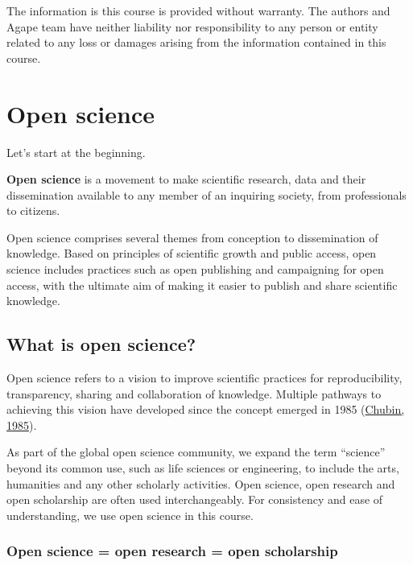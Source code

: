 \documentclass[
]{book}
\begin{document}
The information is this course is provided without warranty. The authors and Agape team have neither liability nor responsibility to any person or entity related to any loss or damages arising from the information contained in this course.

\hypertarget{open-science}{%
\chapter{Open science}\label{open-science}}

Let's start at the beginning.

\textbf{Open science} is a movement to make scientific research, data and their dissemination available to any member of an inquiring society, from professionals to citizens.

Open science comprises several themes from conception to dissemination of knowledge. Based on principles of scientific growth and public access, open science includes practices such as open publishing and campaigning for open access, with the ultimate aim of making it easier to publish and share scientific knowledge.

\hypertarget{what-is-open-science}{%
\section{What is open science?}\label{what-is-open-science}}

Open science refers to a vision to improve scientific practices for reproducibility, transparency, sharing and collaboration of knowledge. Multiple pathways to achieving this vision have developed since the concept emerged in 1985 (\href{https://journals.sagepub.com/doi/10.1177/016224398501000211}{Chubin, 1985}).

As part of the global open science community, we expand the term ``science'' beyond its common use, such as life sciences or engineering, to include the arts, humanities and any other scholarly activities. Open science, open research and open scholarship are often used interchangeably. For consistency and ease of understanding, we use open science in this course.

\hypertarget{open-science-open-research-open-scholarship}{%
\subsection{Open science = open research = open scholarship}\label{open-science-open-research-open-scholarship}}
\end{document}
